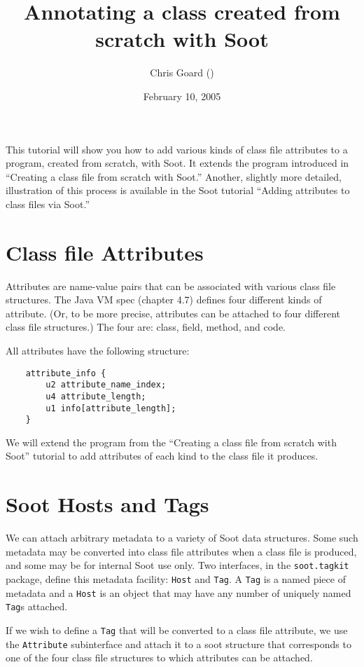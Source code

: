 \documentclass{article}
\title{Annotating a class created from scratch with Soot}
\author{Chris Goard 
(\htmladdnormallink{cgoard@sable.mcgill.ca}{mailto:cgoard@sable.mcgill.ca})}
\date{February 10, 2005}
\begin{document}
\maketitle

This tutorial will show you how to add various kinds of class file attributes 
to a program, created from scratch, with Soot. It extends the program 
introduced in ``Creating a class file from scratch with Soot.'' Another, 
slightly more detailed,
illustration of this process is available in the Soot tutorial ``Adding 
attributes to class files via Soot.''

\section{Class file Attributes}
Attributes are name-value pairs that can be associated with various class file 
structures. The Java VM spec (chapter 4.7) defines four different kinds of 
attribute. (Or, to be more precise, attributes can be attached to four 
different class file structures.) The four are: class, field, method, and 
code.

All attributes have the following structure:

\begin{verbatim}
    attribute_info {
        u2 attribute_name_index;
        u4 attribute_length;
        u1 info[attribute_length];
    }
\end{verbatim}

We will extend the program from the ``Creating a class file from scratch with 
Soot'' tutorial to add attributes of each kind to the class file it produces.

\section{Soot Hosts and Tags}

We can attach arbitrary metadata to a variety of Soot data structures. Some 
such metadata may be converted into class file attributes when a class file 
is produced, and some may be for internal Soot use only. Two interfaces, in 
the {\tt soot.tagkit} package, define this metadata facility: {\tt Host} and 
{\tt Tag}. A {\tt Tag} is a named piece of metadata and a {\tt Host} is an 
object that may have any number of uniquely named {\tt Tag}s attached.

If we wish to define a {\tt Tag} that will be converted to a class file 
attribute, we use the {\tt Attribute} subinterface and attach it to a soot 
structure that corresponds to one of the four class file structures to which 
attributes can be attached.
\end{document}
